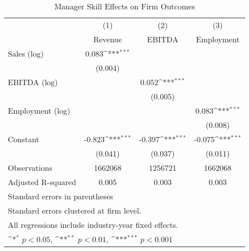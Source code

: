 \begin{table}[htbp]\centering
\def\sym#1{\ifmmode^{#1}\else\(^{#1}\)\fi}
\caption{Manager Skill Effects on Firm Outcomes}
\begin{tabular}{l*{3}{c}}
\toprule
                    &\multicolumn{1}{c}{(1)}&\multicolumn{1}{c}{(2)}&\multicolumn{1}{c}{(3)}\\
                    &\multicolumn{1}{c}{Revenue}&\multicolumn{1}{c}{EBITDA}&\multicolumn{1}{c}{Employment}\\
\midrule
Sales (log)         &       0.083\sym{***}&                     &                     \\
                    &     (0.004)         &                     &                     \\
\addlinespace
EBITDA (log)        &                     &       0.052\sym{***}&                     \\
                    &                     &     (0.005)         &                     \\
\addlinespace
Employment (log)    &                     &                     &       0.083\sym{***}\\
                    &                     &                     &     (0.008)         \\
\addlinespace
Constant            &      -0.823\sym{***}&      -0.397\sym{***}&      -0.075\sym{***}\\
                    &     (0.041)         &     (0.037)         &     (0.011)         \\
\midrule
Observations        &     1662068         &     1256721         &     1662068         \\
Adjusted R-squared  &       0.005         &       0.003         &       0.003         \\
\bottomrule
\multicolumn{4}{l}{\footnotesize Standard errors in parentheses}\\
\multicolumn{4}{l}{\footnotesize Standard errors clustered at firm level.}\\
\multicolumn{4}{l}{\footnotesize All regressions include industry-year fixed effects.}\\
\multicolumn{4}{l}{\footnotesize \sym{*} \(p<0.05\), \sym{**} \(p<0.01\), \sym{***} \(p<0.001\)}\\
\end{tabular}
\end{table}
